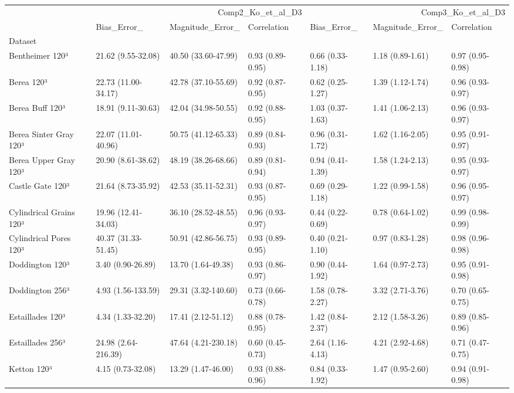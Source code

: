 \begin{tabular}{lllllll}
\toprule
 & \multicolumn{3}{r}{Comp2_Ko_et_al_D3} & \multicolumn{3}{r}{Comp3_Ko_et_al_D3} \\
 & Bias_Error_ & Magnitude_Error_ & Correlation & Bias_Error_ & Magnitude_Error_ & Correlation \\
Dataset &  &  &  &  &  &  \\
\midrule
Bentheimer 120³ & 21.62 (9.55-32.08) & 40.50 (33.60-47.99) & 0.93 (0.89-0.95) & 0.66 (0.33-1.18) & 1.18 (0.89-1.61) & 0.97 (0.95-0.98) \\
Berea 120³ & 22.73 (11.00-34.17) & 42.78 (37.10-55.69) & 0.92 (0.87-0.95) & 0.62 (0.25-1.27) & 1.39 (1.12-1.74) & 0.96 (0.93-0.97) \\
Berea Buff 120³ & 18.91 (9.11-30.63) & 42.04 (34.98-50.55) & 0.92 (0.88-0.95) & 1.03 (0.37-1.63) & 1.41 (1.06-2.13) & 0.96 (0.93-0.97) \\
Berea Sinter Gray 120³ & 22.07 (11.01-40.96) & 50.75 (41.12-65.33) & 0.89 (0.84-0.93) & 0.96 (0.31-1.72) & 1.62 (1.16-2.05) & 0.95 (0.91-0.97) \\
Berea Upper Gray 120³ & 20.90 (8.61-38.62) & 48.19 (38.26-68.66) & 0.89 (0.81-0.94) & 0.94 (0.41-1.39) & 1.58 (1.24-2.13) & 0.95 (0.93-0.97) \\
Castle Gate 120³ & 21.64 (8.73-35.92) & 42.53 (35.11-52.31) & 0.93 (0.87-0.95) & 0.69 (0.29-1.18) & 1.22 (0.99-1.58) & 0.96 (0.95-0.97) \\
Cylindrical Grains 120³ & 19.96 (12.41-34.03) & 36.10 (28.52-48.55) & 0.96 (0.93-0.97) & 0.44 (0.22-0.69) & 0.78 (0.64-1.02) & 0.99 (0.98-0.99) \\
Cylindrical Pores 120³ & 40.37 (31.33-51.45) & 50.91 (42.86-56.75) & 0.93 (0.89-0.95) & 0.40 (0.21-1.10) & 0.97 (0.83-1.28) & 0.98 (0.96-0.98) \\
Doddington 120³ & 3.40 (0.90-26.89) & 13.70 (1.64-49.38) & 0.93 (0.86-0.97) & 0.90 (0.44-1.92) & 1.64 (0.97-2.73) & 0.95 (0.91-0.98) \\
Doddington 256³ & 4.93 (1.56-133.59) & 29.31 (3.32-140.60) & 0.73 (0.66-0.78) & 1.58 (0.78-2.27) & 3.32 (2.71-3.76) & 0.70 (0.65-0.75) \\
Estaillades 120³ & 4.34 (1.33-32.20) & 17.41 (2.12-51.12) & 0.88 (0.78-0.95) & 1.42 (0.84-2.37) & 2.12 (1.58-3.26) & 0.89 (0.85-0.96) \\
Estaillades 256³ & 24.98 (2.64-216.39) & 47.64 (4.21-230.18) & 0.60 (0.45-0.73) & 2.64 (1.16-4.13) & 4.21 (2.92-4.68) & 0.71 (0.47-0.75) \\
Ketton 120³ & 4.15 (0.73-32.08) & 13.29 (1.47-46.00) & 0.93 (0.88-0.96) & 0.84 (0.33-1.92) & 1.47 (0.95-2.60) & 0.94 (0.91-0.98) \\

\end{tabular}
